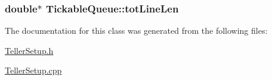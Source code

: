\subsubsection[{\texorpdfstring{tot\+Line\+Len}{totLineLen}}]{\setlength{\rightskip}{0pt plus 5cm}double$\ast$ Tickable\+Queue\+::tot\+Line\+Len\hspace{0.3cm}{\ttfamily [private]}}\hypertarget{class_tickable_queue_a29b6a86071a7c56798a5a8633435260e}{}\label{class_tickable_queue_a29b6a86071a7c56798a5a8633435260e}


The documentation for this class was generated from the following files\+:\begin{DoxyCompactItemize}
\item 
\hyperlink{_teller_setup_8h}{Teller\+Setup.\+h}\item 
\hyperlink{_teller_setup_8cpp}{Teller\+Setup.\+cpp}\end{DoxyCompactItemize}
